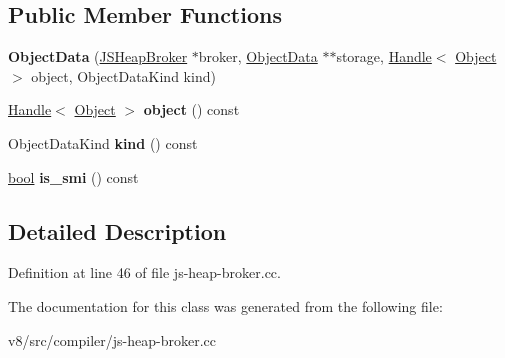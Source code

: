 \subsection*{Public Member Functions}
\begin{DoxyCompactItemize}
\item 
\mbox{\label{classv8_1_1internal_1_1compiler_1_1ObjectData_a3c28cbe762b2941faac9a73ab7ee81dc}} 
{\bfseries Object\+Data} (\mbox{\hyperlink{classv8_1_1internal_1_1compiler_1_1JSHeapBroker}{J\+S\+Heap\+Broker}} $\ast$broker, \mbox{\hyperlink{classv8_1_1internal_1_1compiler_1_1ObjectData}{Object\+Data}} $\ast$$\ast$storage, \mbox{\hyperlink{classv8_1_1internal_1_1Handle}{Handle}}$<$ \mbox{\hyperlink{classv8_1_1internal_1_1Object}{Object}} $>$ object, Object\+Data\+Kind kind)
\item 
\mbox{\label{classv8_1_1internal_1_1compiler_1_1ObjectData_ab8e56e6e6e5ed51c454c3513f8cddaa3}} 
\mbox{\hyperlink{classv8_1_1internal_1_1Handle}{Handle}}$<$ \mbox{\hyperlink{classv8_1_1internal_1_1Object}{Object}} $>$ {\bfseries object} () const
\item 
\mbox{\label{classv8_1_1internal_1_1compiler_1_1ObjectData_aeb02124643ae49c8d8db02e6121acce2}} 
Object\+Data\+Kind {\bfseries kind} () const
\item 
\mbox{\label{classv8_1_1internal_1_1compiler_1_1ObjectData_a3f8e483124641d6455f8ffc82dc75563}} 
\mbox{\hyperlink{classbool}{bool}} {\bfseries is\+\_\+smi} () const
\end{DoxyCompactItemize}


\subsection{Detailed Description}


Definition at line 46 of file js-\/heap-\/broker.\+cc.



The documentation for this class was generated from the following file\+:\begin{DoxyCompactItemize}
\item 
v8/src/compiler/js-\/heap-\/broker.\+cc\end{DoxyCompactItemize}
